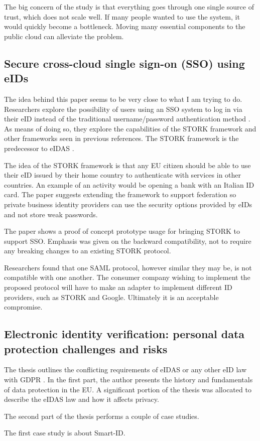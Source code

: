 The big concern of the study is that everything goes through one single source of trust, which does not scale well. If many people wanted to use the system, it would quickly become a bottleneck. Moving many essential components to the public cloud can alleviate the problem.

\subsection{Secure cross-cloud single sign-on (SSO) using eIDs}

The idea behind this paper seems to be very close to what I am trying to do. Researchers explore the possibility of users using an SSO system to log in via their eID instead of the traditional username/password authentication method \cite{secure-signon}. As means of doing so, they explore the capabilities of the STORK framework and other frameworks seen in previous references. The STORK framework is the predecessor to eIDAS \cite{stork}.

The idea of the STORK framework is that any EU citizen should be able to use their eID issued by their home country to authenticate with services in other countries. An example of an activity would be opening a bank with an Italian ID card. The paper suggests extending the framework to support federation so private business identity providers can use the security options provided by eIDs and not store weak passwords.

The paper shows a proof of concept prototype usage for bringing STORK to support SSO. Emphasis was given on the backward compatibility, not to require any breaking changes to an existing STORK protocol.

Researchers found that one SAML protocol, however similar they may be, is not compatible with one another. The consumer company wishing to implement the proposed protocol will have to make an adapter to implement different ID providers, such as STORK and Google. Ultimately it is an acceptable compromise.

\subsection{Electronic identity verification: personal data protection challenges and risks}

The thesis outlines the conflicting requirements of eIDAS or any other eID law with GDPR \cite{gdpr-thesis}. In the first part, the author presents the history and fundamentals of data protection in the EU. A significant portion of the thesis was allocated to describe the eIDAS law and how it affects privacy. 

The second part of the thesis performs a couple of case studies. 

The first case study is about Smart-ID. 

